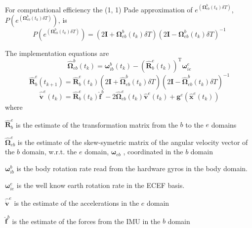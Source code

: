 \documentclass[a4paper]{report}
\numberwithin{equation}{chapter}
\newcommand{\mat}[1]{\boldsymbol{#1}}
\begin{document}
For computational efficiency the (1, 1) Pade approximation of $e^{\left( \mat{\Omega}^b_{eb} \left( t_k \right) \delta{T} \right)}$, $P \left(e^{\left( \mat{\Omega}^b_{eb} \left( t_k \right) \delta{T} \right)} \right)$, is
\begin{equation}
P \left( e^{\left( \mat{\Omega}^b_{eb} \left( t_k \right) \delta{T} \right)} \right) = \left( 2\mat{I} + \mat{\Omega}^b_{eb} \left( t_k \right) \delta{T} \right)\left( 2\mat{I} - \mat{\Omega}^b_{eb} \left( t_k \right) \delta{T} \right)^{-1}
\end{equation}

\bigskip

The implementation equations are
\begin{equation}
\hat{\mat{\Omega}}^b_{eb} \left( t_k \right) = \mat{\omega}^b_{ib} \left( t_k \right) - \left( \hat{\mat{R}}^e_b \left( t_k \right) \right)^{\mathrm{T}} \mat{\omega}^e_{ie}
\end{equation}
\begin{equation}
\hat{\mat{R}}^e_b \left( t_{k + 1} \right) = \hat{\mat{R}}^e_b \left( t_k \right) \left( 2\mat{I} + \hat{\mat{\Omega}}^b_{eb} \left( t_k \right) \delta{T} \right)\left( 2\mat{I} - \hat{\mat{\Omega}}^b_{eb} \left( t_k \right) \delta{T} \right)^{-1}
\end{equation}
\begin{equation}
\hat{\dot{\mat{v}}}^e \left( t_k \right) = \hat{\mat{R}}^e_b \left( t_k \right) \hat{\mat{f}}^b - 2 \hat{\mat{\Omega}}^e_{eb} \left( t_k \right) \hat{\mat{v}}^e \left( t_k \right) + \mat{g}^e \left( \hat{\mat{x}}^e \left( t_k \right) \right)
\end{equation}
where

  $\hat{\mat{R}}^e_b$ is the estimate of the transformation matrix from the $b$ to the $e$ domains

  $\hat{\mat{\Omega}}^e_{eb}$ is the estimate of the skew-symetric matrix of the angular velocity vector of the $b$ domain, w.r.t. the $e$ domain, $\mat{\omega}_{eb}$ , coordinated in the $b$ domain

  $\mat{\omega}^b_{ib}$ is the body rotation rate read from the hardware gyros in the body domain.

  $\mat{\omega}^e_{ie}$ is the well know earth rotation rate in the ECEF basis.

  $\hat{\dot{\mat{v}}}^e$ is the estimate of the accelerations in the $e$ domain

  $\hat{\mat{f}}^b$ is the estimate of the forces from the IMU in the $b$ domain
\end{document}
